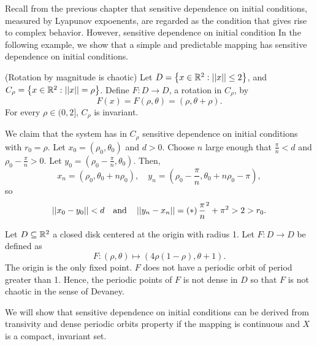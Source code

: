 \documentclass[12pt,draft,twoside]{article}
\begin{document}
Recall from the previous chapter that sensitive dependence on initial conditions, measured by Lyapunov expoenents, are regarded as the condition that gives rise to complex behavior.
However, sensitive dependence on initial condition 
In the following example, we show that a simple and predictable mapping has sensitive dependence on initial conditions.
%
\begin{example}
  (Rotation by magnitude is chaotic)
  Let $D = \left \{ x \in \mathbb{R}^2: \left|\left| x \right|\right| \leq 2 \right \}$, and $C_\rho = \left \{ x \in \mathbb{R}^2: \left|\left| x \right|\right| = \rho \right \}$.
  Define $F: D \to D$, a rotation in $C_\rho$, by
  \begin{equation*}
    F(x) = F(\rho, \theta) = (\rho, \theta + \rho).
  \end{equation*}
  For every $\rho \in (0,2]$, $C_\rho$ is invariant.

  We claim that the system has in $C_\rho$ sensitive dependence on initial conditions with $r_0 = \rho$.
  Let $x_0 = (\rho_0, \theta_0)$ and $d > 0$.
  Choose $n$ large enough that $\frac{\pi}{n} < d$ and $\rho_0 - \frac{\pi}{n} > 0$.
  Let $y_0 = (\rho_0 - \frac{\pi}{n}, \theta_0)$.
  Then,
  \begin{equation*}
    x_n = (\rho_0, \theta_0 + n\rho_0),\quad
    y_n = (\rho_0 - \frac{\pi}{n}, \theta_0 + n\rho_0 - \pi),
  \end{equation*}
  so
  \begin{equation*}
    \left|\left| x_0 - y_0 \right|\right| < d \quad \mbox{and} \quad \left|\left| y_n - x_n \right|\right| = \left ( * \right ){\frac{\pi}{n}}^2 + \pi^2 > 2 > r_0.
  \end{equation*}
\end{example}

\begin{example}
  Let $D \subseteq \mathbb{R}^2$ a closed disk centered at the origin with radius 1.
  Let $F: D \to D$ be defined as
  \begin{equation*}
    F: (\rho, \theta) \mapsto (4\rho(1 - \rho), \theta + 1).
  \end{equation*}
  The origin is the only fixed point.
  $F$ does not have a periodic orbit of period greater than 1.
  Hence, the periodic points of $F$ is not dense in $D$ so that $F$ is not chaotic in the sense of Devaney.
\end{example}

We will show that sensitive dependence on initial conditions can be derived from transivity and dense periodic orbits property if the mapping is continuous and $X$ is a compact, invariant set. \citep{banks}
\end{document}
